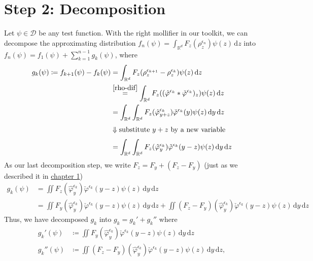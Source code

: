 \section{Step 2: Decomposition}\label{step2:decomposition}

Let \(\psi \in \mathcal{D}\) be any test function. With the right mollifier in our toolkit, we can decompose the approximating distribution \(f_n(\psi) = \int_{\mathbb{R}^d} F_z(\rho_z^{\epsilon_n}) \psi(z)\, \mathrm{d}z\) into \(f_n(\psi) = f_1(\psi) + \sum^{n-1}_{k=1} g_k(\psi)\), where
\begin{align*}
    g_k(\psi) \coloneqq f_{k+1}(\psi) - f_k(\psi) 
    &= \int_{\mathbb{R}^d} F_z(\rho_z^{\epsilon_{k+1}} - \rho_z^{\epsilon_k}) \psi(z)\, \mathrm{d}z \\
    &\overset{\eqref{rho-dif}}{=} \int_{\mathbb{R}^d} F_z((\hat \varphi^{\epsilon_k} * \check \varphi^{\epsilon_k} )_z) \psi(z)\, \mathrm{d}z \\
    &= \int_{\mathbb{R}^d} \int_{\mathbb{R}^{d}} F_z(\hat{\varphi}^{\epsilon_k}_{y+z}) \check \varphi^
    {\epsilon_k}(y) \psi(z) \, \mathrm{d}y \, \mathrm{d}z \\
    \\[-1.2em]
    &\Downarrow \text{substitute \(y+z\) by a new variable} \\
    \\[-1.2em]
    &= \int_{\mathbb{R}^d} \int_{\mathbb{R}^{d}} F_z(\hat{\varphi}^{\epsilon_k}_{y}) \check \varphi^{\epsilon_k}(y-z) \psi(z) \, \mathrm{d}y \, \mathrm{d}z
\end{align*}
As our last decomposition step, we write \(F_z = F_y + (F_z - F_y)\) (just as we described it in \hyperref[sec:motiadsd]{chapter 1})
\begin{align*}
    g_k(\psi) &= \iint F_z(\hat{\varphi}^{\epsilon_k}_{y}) \check \varphi^{\epsilon_k}(y-z) \psi(z) \, \mathrm{d}y \, \mathrm{d}z \\
    &=  \iint F_y(\hat{\varphi}^{\epsilon_k}_{y}) \check \varphi^{\epsilon_k}(y-z) \psi(z) \, \mathrm{d}y \, \mathrm{d}z +  \iint (F_z - F_y)(\hat{\varphi}^{\epsilon_k}_{y}) \check \varphi^{\epsilon_k}(y-z) \psi(z) \, \mathrm{d}y \, \mathrm{d}z
\end{align*}
Thus, we have decomposed \(g_k\) into \(g_k = g_k' + g_k''\) where 
\begin{align*}
    g_k'(\psi) &\coloneqq \iint F_y(\hat{\varphi}^{\epsilon_k}_{y}) \check \varphi^{\epsilon_k}(y-z) \psi(z) \, \mathrm{d}y \, \mathrm{d}z \\
    g_k''(\psi) & \coloneqq \iint (F_z - F_y)(\hat{\varphi}^{\epsilon_k}_{y}) \check \varphi^{\epsilon_k}(y-z) \psi(z) \, \mathrm{d}y \, \mathrm{d}z,
\end{align*}

